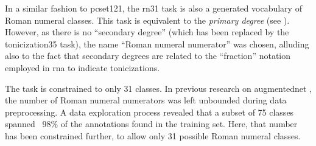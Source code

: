 
In a similar fashion to \gls{pcset121}, the \gls{rn31} task
is also a generated vocabulary of Roman numeral classes.
This task is equivalent to the \emph{primary degree} (see
). However, as there is no
``secondary degree'' (which has been replaced by the
\gls{tonicization35} task), the name ``Roman numeral
numerator'' was chosen, alluding also to the fact that
secondary degrees are related to the ``fraction'' notation
employed in \gls{rna} to indicate tonicizations.

The task is constrained to only 31 classes. In previous
research on \gls{augmentednet}
\parencite{napoleslopez2021augmentednet}, the number of
Roman numeral numerators was left unbounded during data
preprocessing. A data exploration process revealed that a
subset of 75 classes spanned ~98\% of the annotations found
in the training set. Here, that number has been constrained
further, to allow only 31 possible Roman numeral classes.


